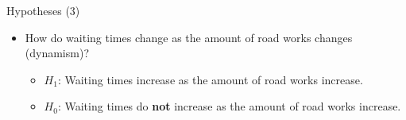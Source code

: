 \begin{frame}{Hypotheses (3)}
    \begin{itemize}
        \setlength\itemsep{1.5em}
            \item How do waiting times change as the amount of road works changes (dynamism)?
                \begin{itemize}
                    \item $H_1$: Waiting times increase as the amount of road works increase.
                    \item $H_0$: Waiting times do \textbf{not} increase as the amount of road works increase.
                \end{itemize}

    \end{itemize}
\end{frame}
